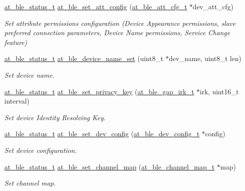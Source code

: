 \begin{DoxyCompactItemize}
\mbox{\hyperlink{group__error__codes__group_ga3b1db9b95feb157b3c188ca27fe76988}{at\+\_\+ble\+\_\+status\+\_\+t}} \mbox{\hyperlink{group__gap__dev__config__group_ga53dde841286e2752674a9d51a20f20cf}{at\+\_\+ble\+\_\+set\+\_\+att\+\_\+config}} (\mbox{\hyperlink{structat__ble__att__cfg__t}{at\+\_\+ble\+\_\+att\+\_\+cfg\+\_\+t}} $\ast$dev\+\_\+att\+\_\+cfg)
\begin{DoxyCompactList}\small\item\em Set attribute permissions configuration (Device Appearance permissions, slave preferred connection parameters, Device Name permissions, Service Change feature) \end{DoxyCompactList}\item 
\mbox{\hyperlink{group__error__codes__group_ga3b1db9b95feb157b3c188ca27fe76988}{at\+\_\+ble\+\_\+status\+\_\+t}} \mbox{\hyperlink{group__gap__dev__config__group_ga01a50db5b472a8b84738d15120abb63b}{at\+\_\+ble\+\_\+device\+\_\+name\+\_\+set}} (uint8\+\_\+t $\ast$dev\+\_\+name, uint8\+\_\+t len)
\begin{DoxyCompactList}\small\item\em Set device name. \end{DoxyCompactList}\item 
\mbox{\hyperlink{group__error__codes__group_ga3b1db9b95feb157b3c188ca27fe76988}{at\+\_\+ble\+\_\+status\+\_\+t}} \mbox{\hyperlink{group__gap__dev__config__group_ga113d6fa1fc84f3450f92b1f45bd49f22}{at\+\_\+ble\+\_\+set\+\_\+privacy\+\_\+key}} (\mbox{\hyperlink{structat__ble__gap__irk__t}{at\+\_\+ble\+\_\+gap\+\_\+irk\+\_\+t}} $\ast$irk, uint16\+\_\+t interval)
\begin{DoxyCompactList}\small\item\em Set device Identity Resolving Key. \end{DoxyCompactList}\item 
\mbox{\hyperlink{group__error__codes__group_ga3b1db9b95feb157b3c188ca27fe76988}{at\+\_\+ble\+\_\+status\+\_\+t}} \mbox{\hyperlink{group__gap__dev__config__group_ga6d329f50553f677f15cb89a823be9dc1}{at\+\_\+ble\+\_\+set\+\_\+dev\+\_\+config}} (\mbox{\hyperlink{structat__ble__dev__config__t}{at\+\_\+ble\+\_\+dev\+\_\+config\+\_\+t}} $\ast$config)
\begin{DoxyCompactList}\small\item\em Set device configuration. \end{DoxyCompactList}\item 
\mbox{\hyperlink{group__error__codes__group_ga3b1db9b95feb157b3c188ca27fe76988}{at\+\_\+ble\+\_\+status\+\_\+t}} \mbox{\hyperlink{group__gap__dev__config__group_gaabff432b5c853bdc3e8aca925a1fa7b0}{at\+\_\+ble\+\_\+set\+\_\+channel\+\_\+map}} (\mbox{\hyperlink{structat__ble__channel__map__t}{at\+\_\+ble\+\_\+channel\+\_\+map\+\_\+t}} $\ast$map)
\begin{DoxyCompactList}\small\item\em Set channel map. \end{DoxyCompactList}\end{DoxyCompactItemize}



